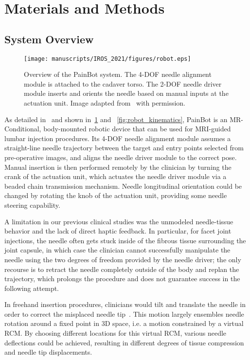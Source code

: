\section{Materials and Methods}
\label{sec:chap-2-material-and-methods}

\subsection{System Overview}
\label{sec:chap-2-system-overview}

\begin{figure}[h]
  \centering
  \texttt{[image: manuscripts/IROS\_2021/figures/robot.eps]}
  \caption{Overview of the PainBot system. The 4-DOF needle alignment module is attached to the cadaver torso. The 2-DOF needle driver module inserts and orients the needle based on manual inputs at the actuation unit. Image adapted from~\parencite{liFullyActuatedBodyMounted2020} with permission.}
  \label{fig:painbot_overview}
\end{figure}

As detailed in~\parencite{liFullyActuatedBodyMounted2020a,liFullyActuatedBodyMounted2020} and shown in~\cref{fig:painbot_overview} and ~\cref{fig:robot_kinematics}, PainBot is an MR-Conditional, body-mounted robotic device that can be used for MRI-guided lumbar injection procedures. Its 4-DOF needle alignment module assumes a straight-line needle trajectory between the target and entry points selected from pre-operative images, and aligns the needle driver module to the correct pose. Manual insertion is then performed remotely by the clinician by turning the crank of the actuation unit, which actuates the needle driver module via a beaded chain transmission mechanism. Needle longitudinal orientation could be changed by rotating the knob of the actuation unit, providing some needle steering capability.

A limitation in our previous clinical studies was the unmodeled needle-tissue behavior and the lack of direct haptic feedback. In particular, for facet joint injections, the needle often gets stuck inside of the fibrous tissue surrounding the joint capsule, in which case the clinician cannot successfully manipulate the needle using the two degrees of freedom provided by the needle driver; the only recourse is to retract the needle completely outside of the body and replan the trajectory, which prolongs the procedure and does not guarantee success in the following attempt.

In freehand insertion procedures, clinicians would tilt and translate the needle in order to correct the misplaced needle tip~\parencite{fritzAugmentedRealityVisualization2012}. This motion largely ensembles needle rotation around a fixed point in 3D space, i.e. a motion constrained by a virtual RCM. By choosing different locations for this virtual RCM, various needle deflections could be achieved, resulting in different degrees of tissue compression and needle tip displacements.


